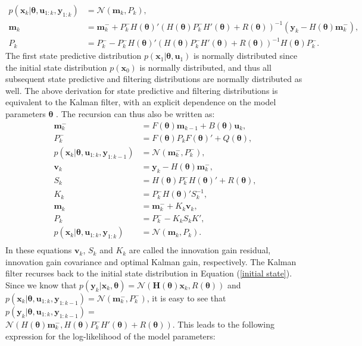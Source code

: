 \begin{equation}
\begin{aligned}
p(\bm x_k|\bm \theta, \bm u_{1:k},\bm y_{1:k}) &= \mathcal{N}(\bm m_k, P_k),\\
\bm m_k &= \bm m_{k}^- + P_{k}^-H(\bm \theta)'(H(\bm \theta)P_{k}^-H'(\bm \theta) +R(\bm \theta))^{-1} (\bm y_k - H(\bm \theta)\bm m_{k}^-),\\
P_k &= P_{k}^- - P_{k}^-H(\bm \theta)'(H(\bm \theta)P_{k}^-H'(\bm \theta) +R(\bm \theta))^{-1}H(\bm \theta)P_{k}^-. 
\end{aligned}
\end{equation}
The first state predictive distribution $p(\bm x_1|\bm \theta, \bm u_1)$ is normally distributed since the initial state distribution $p(\bm x_0)$ is normally distributed, and thus all subsequent state predictive and filtering distributions are normally distributed as well. The above derivation for state predictive and filtering distributions is equivalent to the Kalman filter, with an explicit dependence on the model parameters $\bm \theta$ \parencite{sarkka}. The recursion can thus also be written as:
\begin{equation}
\begin{aligned}
\bm m_{k}^- &= F(\bm \theta)\bm m_{k-1} + B(\bm \theta)\bm u_k,\\
P_{k}^- &= F(\bm \theta)P_{k}F(\bm \theta)' + Q(\bm \theta),\\
p(\bm x_k|\bm \theta, \bm u_{1:k},\bm y_{1:k-1})  &=  \mathcal{N}(\bm m_{k}^-,P_{k}^-),\\
\bm v_k &= \bm y_k - H(\bm \theta)\bm m_{k}^-,\\
S_k &= H(\bm \theta)P_{k}^-H(\bm \theta)' +R(\bm \theta),\\
K_k &= P_{k}^-H(\bm \theta)'S_{k}^{-1},\\
\bm m_k &= \bm m_{k}^- + K_k \bm v_k,\\
P_k &= P_{k}^- - K_k S_k K',\\
p(\bm x_k|\bm \theta, \bm u_{1:k},\bm y_{1:k}) &= \mathcal{N}(\bm m_k,P_k).\\
\end{aligned}
\label{Kalman}
\end{equation}
In these equations $\bm v_k$, $S_k$ and $K_k$ are called the innovation gain residual, innovation gain covariance and optimal Kalman gain, respectively.
The Kalman filter recurses back to the initial state distribution in Equation (\ref{initial state}). Since we know that $p(\bm y_k|\bm x_k, \bm \theta) = \mathcal{N}(\bm H(\bm \theta)\bm x_k,R(\bm \theta))$ and $p(\bm x_k|\bm \theta, \bm u_{1:k},\bm y_{1:k-1})  =  \mathcal{N}(\bm m_{k}^-,P_{k}^-)$, it is easy to see that $p(\bm y_k|\bm \theta, \bm u_{1:k},\bm y_{1:k-1})=$\\$ \mathcal{N}( H(\bm \theta)\bm m_{k}^-,H(\bm \theta)P_{k}^-H'(\bm \theta) +R(\bm \theta))$. This leads to the following expression for the log-likelihood of the model parameters:
